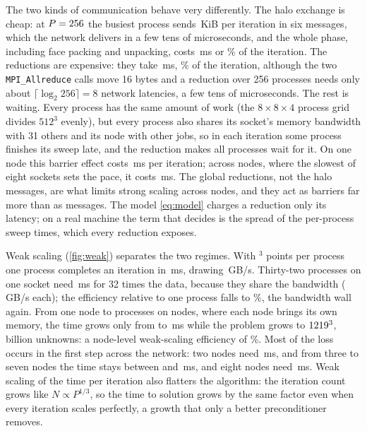 \documentclass[10pt,a4paper]{article}
\newcommand{\code}[1]{\texttt{#1}}
\begin{document}
The two kinds of communication behave very differently. The halo exchange is cheap: at $P=256$ the
busiest process sends \HaloKiBPmax\,KiB per iteration in six messages, which the network delivers in a few
tens of microseconds, and the whole phase, including face packing and unpacking, costs \HaloMsPmax\,ms or
\HaloFracPmax\% of the iteration. The reductions are expensive: they take \RedMsPmax\,ms, \RedFracPmax\%
of the iteration, although the two \code{MPI\_Allreduce} calls move 16 bytes and a reduction over 256
processes needs only about $\lceil\log_2 256\rceil=8$ network latencies, a few tens of microseconds. The
rest is waiting. Every process has the same amount of work (the $8\times8\times4$ process grid divides
$512^3$ evenly), but every process also shares its socket's memory bandwidth with 31 others and its node
with other jobs, so in each iteration some process finishes its sweep late, and the reduction makes all
\Pmax{} processes wait for it. On one node this barrier effect costs \RedMsNode\,ms per iteration; across
\NodesMax{} nodes, where the slowest of eight sockets sets the pace, it costs \RedMsPmax\,ms. The global
reductions, not the halo messages, are what limits strong scaling across nodes, and they act as barriers
far more than as messages. The model \eqref{eq:model} charges a reduction only its latency; on a real
machine the term that decides is the spread of the per-process sweep times, which every reduction exposes.

Weak scaling (\cref{fig:weak}) separates the two regimes. With \WeakLocal$^3$ points per process
one process completes an iteration in \WeakTone\,ms, drawing \WeakBwOne\,GB/s. Thirty-two processes on one
socket need \WeakTnode\,ms for 32 times the data, because they share the bandwidth (\WeakBwNode\,GB/s each);
the efficiency relative to one process falls to \WeakEffNode\%, the bandwidth wall again. From one node to
\WeakPmax{} processes on \NodesMax{} nodes, where each node brings its own memory, the time grows only from
\WeakTnode{} to \WeakTmax\,ms while the problem grows to $1219^3$, \WeakDofsMax{} billion unknowns: a
node-level weak-scaling efficiency of \WeakNodeEff\%. Most of the loss occurs in the first step across the
network: two nodes need \WeakTtwo\,ms, and from three to seven nodes the time stays between \WeakTmidMin{}
and \WeakTmidMax\,ms, and eight nodes need \WeakTmax\,ms. Weak scaling of the time per iteration also flatters the algorithm: the iteration
count grows like $N\propto P^{1/3}$, so the time to solution grows by the same factor even when every
iteration scales perfectly, a growth that only a better preconditioner removes.
\end{document}
